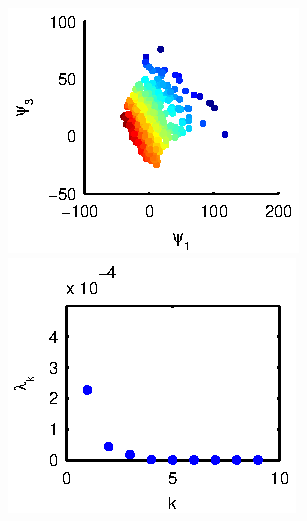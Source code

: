 \begin{figure}[t]
\begin{subfigure}{0.22\textwidth}
\includegraphics[width=\textwidth]{rxn_npoints_embed4}\\
\includegraphics[width=\textwidth]{rxn_npoints_spectrum4}
\caption{}
\label{subfig:rxn_convergence3}
\end{subfigure}
\hfill
\begin{subfigure}{0.22\textwidth}

\end{subfigure}
\end{figure}
